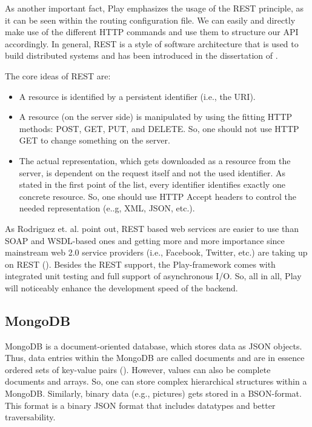 As another important fact, Play emphasizes the usage of the \ac{REST} principle, as it can be seen within the routing configuration file. We can easily and directly make use of the different \ac{HTTP} commands and use them to structure our \ac{API} accordingly. In general, \acf{REST} is a style of software architecture that is used to build distributed systems and has been introduced in the dissertation of \cite{Fielding2000}.

The core ideas of \ac{REST} are:  
\begin{itemize}
\item A resource is identified by a persistent identifier (i.e., the \ac{URI}).
\item A resource (on the server side) is manipulated by using the fitting \ac{HTTP} methods: POST, GET, PUT, and DELETE. So, one should not use \ac{HTTP} GET to change something on the server.
\item The actual representation, which gets downloaded as a resource from the server, is dependent on the request itself and not the used identifier. As stated in the first point of the list, every identifier identifies exactly one concrete resource. So, one should use \ac{HTTP} Accept headers to control the needed representation (e..g, \ac{XML}, \ac{JSON}, etc.).
\end{itemize}

As Rodriguez et. al. point out, \ac{REST} based web services are easier to use than \acf{SOAP} and \acf{WSDL}-based ones and getting more and more importance since mainstream web 2.0 service providers (i.e., Facebook, Twitter, etc.) are taking up on \ac{REST} (\cite{Rodriguez2008}). Besides the \ac{REST} support, the Play-framework comes with integrated unit testing and full support of asynchronous I/O.  So, all in all, Play will noticeably enhance the development speed of the backend.

\subsection{MongoDB}
MongoDB is a document-oriented database, which stores data as \ac{JSON} objects. Thus, data entries within the MongoDB are called documents and are in essence ordered sets of key-value pairs (\cite{Tre14}). However, values can also be complete documents and arrays. So, one can store complex hierarchical structures within a MongoDB. Similarly, binary data (e.g., pictures) gets stored in a \ac{BSON}-format. This format is a binary \ac{JSON} format that includes datatypes and better traversability.

